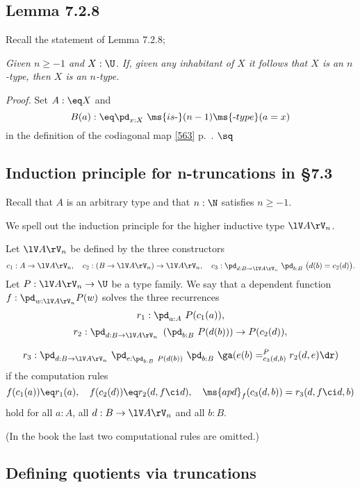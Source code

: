 \documentclass[12pt]{article}
\begin{document}

\subsection{Lemma 7.2.8}

Recall the statement of Lemma 7.2.8;

\nn\emph{Given $n\ge-1$ and $X:\U$. If, given any inhabitant of $X$ it follows that $X$ is an $n$-type, then $X$ is an $n$-type.}

\nn\emph{Proof.} Set $A:\eq X$ and 
$$
B(a):\eq\pd_{x:X}\ \ms{is\text-}(n-1)\ms{\text-type}(a=x)
$$ 
in the definition of the codiagonal map \eqref{563} p.~\pageref{563}. $\sq$



\subsection{Induction principle for n-truncations in \S7.3}

Recall that $A$ is an arbitrary type and that $n:\N$ satisfies $n\ge-1$.

We spell out the induction principle for the higher inductive type $\lV A\rV_n$.

Let $\lV A\rV_n$ be defined by the three constructors 
$$
c_1:A\to \lV A\rV_n,\quad c_2:(B\to \lV A\rV_n)\to \lV A\rV_n,\quad c_3:\pd_{d:B\to \lV A\rV_n}\ \pd_{b:B}\ \big(d(b)=c_2(d)\big).
$$ 
Let $P:\lV A\rV_n\to\U$ be a type family. We say that a dependent function $f:\pd_{w:\lV A\rV_n}P(w)$ solves the three recurrences 
$$
r_1:\pd_{a:A}\ P(c_1(a)),
$$ 
$$
r_2:\pd_{d:B\to \lV A\rV_n}\ \left(\pd_{b:B}\ P(d(b))\right)\to P(c_2(d)),
$$

$$
r_3:\pd_{d:B\to \lV A\rV_n}\ \pd_{e:\pd_{b:B}\ P(d(b))}\ \pd_{b:B}\ \ga(e(b)=^P_{c_3(d,b)}r_2(d,e)\dr)
$$ 
if the computation rules
$$
f(c_1(a))\eq r_1(a),\quad f(c_2(d))\eq r_2(d,f\ci d),\quad\ms{apd}_f(c_3(d,b))=r_3(d,f\ci d,b)
$$ 
hold for all $a:A$, all $d:B\to \lV A\rV_n$ and all $b:B$. 

(In the book the last two computational rules are omitted.)


\subsection{Defining quotients via truncations}\label{qvt}
\end{document}
